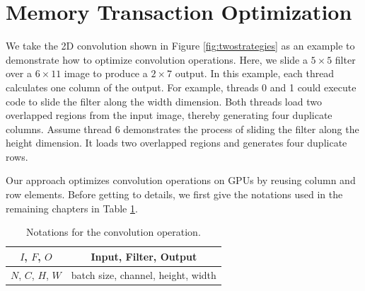 \section{Memory Transaction Optimization}
\label{sec:strategies} 
{\color{red}We take the 2D convolution shown in Figure \ref{fig:twostrategies} as an example to demonstrate how to optimize convolution operations.}
Here, we slide a $5 \times 5$ filter over a $6 \times 11$ image to produce a $2 \times 7$ output. In this example, each thread calculates one column of the output. For example, threads 0 and 1 could execute code to slide the filter along the width dimension. Both threads load two overlapped regions from the input image, thereby generating four duplicate columns. Assume thread 6 demonstrates the process of sliding the filter along the height dimension. It loads two overlapped regions and generates four duplicate rows.


Our approach optimizes convolution operations on GPUs by reusing column and row elements. Before getting to details, we first give the notations used in the remaining chapters in Table \ref{tab:notations}.

\begin{table}[H]
\caption{Notations for the convolution operation.}
	\begin{tabular}{c|c}
	\hline
		$I$, $F$, $O$ & Input, Filter, Output \\
		\hline
		$N$, $C$, $H$, $W$ & batch size, channel, height, width\\
		\hline
	\end{tabular}
	\label{tab:notations}
\end{table}


